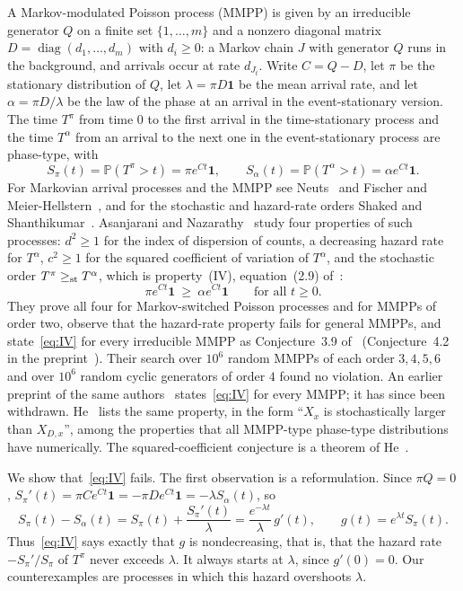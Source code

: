 \documentclass[11pt]{amsart}
\theoremstyle{remark}
\newcommand{\one}{\mathbf 1}
\newcommand{\Pp}{\mathbb P}
\begin{document}
A Markov-modulated Poisson process (MMPP) is given by an irreducible generator $Q$ on a finite set $\{1,\dots,m\}$ and a nonzero diagonal matrix $D=\operatorname{diag}(d_1,\dots,d_m)$ with $d_i\ge0$: a Markov chain $J$ with generator $Q$ runs in the background, and arrivals occur at rate $d_{J_t}$. Write $C=Q-D$, let $\pi$ be the stationary distribution of $Q$, let $\lambda=\pi D\one$ be the mean arrival rate, and let $\alpha=\pi D/\lambda$ be the law of the phase at an arrival in the event-stationary version. The time $T^\pi$ from time $0$ to the first arrival in the time-stationary process and the time $T^\alpha$ from an arrival to the next one in the event-stationary process are phase-type, with
\begin{equation}\label{eq:surv}
S_\pi(t)=\Pp(T^\pi>t)=\pi e^{Ct}\one,\qquad S_\alpha(t)=\Pp(T^\alpha>t)=\alpha e^{Ct}\one .
\end{equation}
For Markovian arrival processes and the MMPP see Neuts~\cite{Neu79} and Fischer and Meier-Hellstern~\cite{FMH93}, and for the stochastic and hazard-rate orders Shaked and Shanthikumar~\cite{SS07}. Asanjarani and Nazarathy~\cite{AN} study four properties of such processes: $d^2\ge1$ for the index of dispersion of counts, a decreasing hazard rate for $T^\alpha$, $c^2\ge1$ for the squared coefficient of variation of $T^\alpha$, and the stochastic order $T^\pi\ge_{\rm st}T^\alpha$, which is property~(IV), equation~(2.9) of~\cite{AN}:
\begin{equation}\label{eq:IV}
\pi e^{Ct}\one\ \ge\ \alpha e^{Ct}\one\qquad\text{for all }t\ge0 .
\end{equation}
They prove all four for Markov-switched Poisson processes and for MMPPs of order two, observe that the hazard-rate property fails for general MMPPs, and state~\eqref{eq:IV} for every irreducible MMPP as Conjecture~3.9 of~\cite[p.~65]{AN} (Conjecture~4.2 in the preprint~\cite{ANarx}). Their search over $10^6$ random MMPPs of each order $3,4,5,6$ and over $10^6$ random cyclic generators of order $4$ found no violation. An earlier preprint of the same authors~\cite[Theorem~3.1]{AN18} states~\eqref{eq:IV} for every MMPP; it has since been withdrawn. He~\cite[Section~4.3]{He} lists the same property, in the form ``$X_x$ is stochastically larger than $X_{D,x}$'', among the properties that all MMPP-type phase-type distributions have numerically. The squared-coefficient conjecture is a theorem of He~\cite[Theorem~3.2]{He}.

We show that~\eqref{eq:IV} fails. The first observation is a reformulation. Since $\pi Q=0$, $S_\pi'(t)=\pi Ce^{Ct}\one=-\pi De^{Ct}\one=-\lambda S_\alpha(t)$, so
\begin{equation}\label{eq:g}
S_\pi(t)-S_\alpha(t)=S_\pi(t)+\frac{S_\pi'(t)}{\lambda}=\frac{e^{-\lambda t}}{\lambda}\,g'(t),\qquad g(t)=e^{\lambda t}S_\pi(t).
\end{equation}
Thus~\eqref{eq:IV} says exactly that $g$ is nondecreasing, that is, that the hazard rate $-S_\pi'/S_\pi$ of $T^\pi$ never exceeds $\lambda$. It always starts at $\lambda$, since $g'(0)=0$. Our counterexamples are processes in which this hazard overshoots $\lambda$.
\end{document}
